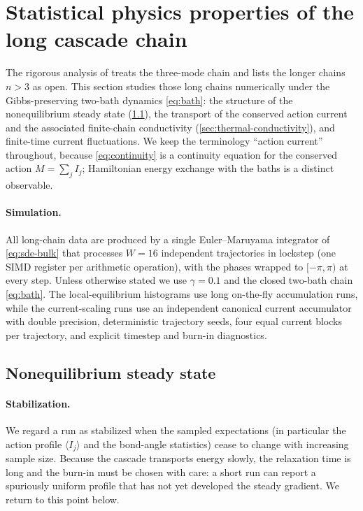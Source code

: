 \documentclass[11pt,a4paper]{article}
\theoremstyle{definition}
\numberwithin{equation}{section}   %
\begin{document}
\section{Statistical physics properties of the long cascade chain}\label{sec:long-chain}

The rigorous analysis of \cite{HLNS} treats the three-mode chain and lists the
longer chains $n>3$ as open. This section studies those long chains
numerically under the Gibbs-preserving two-bath dynamics \eqref{eq:bath}: the
structure of the nonequilibrium steady state (\cref{sec:ness-long}), the
transport of the conserved action current and the associated finite-chain
conductivity (\cref{sec:thermal-conductivity}), and finite-time current
fluctuations. We keep the terminology ``action current'' throughout, because
\eqref{eq:continuity} is a continuity equation for the conserved action
$M=\sum_j I_j$; Hamiltonian energy exchange with the baths is a distinct
observable.

\paragraph{Simulation.}
All long-chain data are produced by a single Euler--Maruyama integrator of
\eqref{eq:sde-bulk} that processes $W=16$ independent trajectories in lockstep
(one SIMD register per arithmetic operation), with the phases wrapped to
$[-\pi,\pi)$ at every step. Unless otherwise stated we use $\gamma=0.1$ and the
closed two-bath chain \eqref{eq:bath}. The local-equilibrium histograms use
long on-the-fly accumulation runs, while the current-scaling runs use an
independent canonical current accumulator with double precision, deterministic
trajectory seeds, four equal current blocks per trajectory, and explicit
timestep and burn-in diagnostics.

\subsection{Nonequilibrium steady state}\label{sec:ness-long}

\paragraph{Stabilization.}
We regard a run as stabilized when the sampled expectations (in particular the
action profile $\langle I_j\rangle$ and the bond-angle statistics) cease to
change with increasing sample size. Because the cascade transports energy
slowly, the relaxation time is long and the burn-in must be chosen with care:
a short run can report a spuriously uniform profile that has not yet developed
the steady gradient. We return to this point below.
\end{document}
